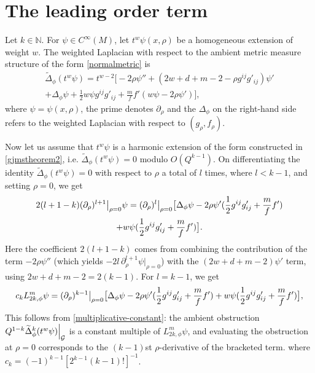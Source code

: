 \documentclass{amsart}
\newcommand\restr[2]{{%
  \left.\kern-\nulldelimiterspace %
  #1 %
  \right|_{#2} %
  }}
\begin{document}
\section{The leading order term}
\label{sec:cwgo}
Let $k\in\mathbb{N}$. For $\psi\in C^\infty(M)$, let $t^w\psi(x,\rho)$ be a homogeneous extension of weight $w$. The weighted Laplacian with respect to the ambient metric measure structure of the form \cref{normalmetric} is
\begin{multline}
\label{tildelaplacian}
\widetilde{\Delta}_\phi(t^w\psi)=t^{w-2}\big[-2\rho\psi''+(2w+d+m-2-\rho g^{ij}g'_{ij})\psi'\\+
\Delta_\phi\psi+\frac{1}{2}w\psi g^{ij}g'_{ij}
+\frac{m}{f}f'(w\psi-2\rho\psi')\big],
\end{multline}
where $\psi=\psi(x,\rho)$, the prime denotes $\partial_{\rho}$ and the $\Delta_\phi$ on the right-hand side refers to the weighted Laplacian with respect to $(g_\rho,f_\rho)$. 

{Now let us assume that $t^w\psi$ is a harmonic extension of the form constructed in \cref{gjmstheorem2}, i.e. $\widetilde{\Delta}_\phi(t^w\psi)=0$ modulo $O(Q^{k-1})$. On differentiating the identity $\widetilde{\Delta}_\phi(t^w\psi)=0$ with respect to $\rho$ a total of $l$ times, where $l<k-1$, and setting $\rho=0$, we get}
\begin{multline}
\label{expanded-laplacian-derivative}
2(l+1-k)\restr{(\partial_{\rho})^{l+1}}{\rho=0}\psi=\restr{(\partial_{\rho})^l}{\rho=0}\big[\Delta_\phi\psi-2\rho\psi'( \frac{1}{2}g^{ij}g'_{ij}+\frac{m}{f}f')\\
+w\psi(\frac{1}{2}g^{ij}g'_{ij}+\frac{m}{f}f')\big].
\end{multline} {Here the coefficient $2(l+1-k)$ comes from combining the contribution of the term $-2\rho\psi''$ (which yields $-2l\,\partial_\rho^{l+1}\psi|_{\rho=0}$) with the $(2w+d+m-2)\psi'$ term, using $2w+d+m-2=2(k-1)$.} For $l=k-1$, we get 
\begin{equation}
\label{k-1}    
c_k L_{2k,\phi}^m \psi=\restr{(\partial_{\rho})^{k-1}}{\rho=0}\big[\Delta_\phi\psi-2\rho\psi'( \frac{1}{2}g^{ij}g'_{ij}+\frac{m}{f}f')+w\psi(\frac{1}{2}g^{ij}g'_{ij}+\frac{m}{f}f')\big],
\end{equation} {This follows from \cref{multiplicative-constant}: the ambient obstruction $\restr{Q^{1-k}\widetilde{\Delta}_\phi^k(t^w\psi)}{\mathcal{G}}$ is a constant multiple of $L_{2k,\phi}^m\psi$, and evaluating the obstruction at $\rho=0$ corresponds to the $(k-1)$st $\rho$-derivative of the bracketed term.} where $c_k=(-1)^{k-1}[2^{k-1}(k-1)!]^{-1}$. 
\end{document}
